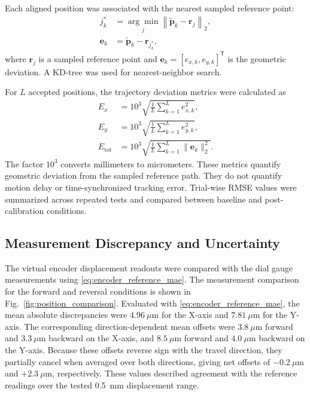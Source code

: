 \documentclass[journal]{IEEEtran}
\newcommand{\figref}[1]{Fig.~\ref{#1}}
\begin{document}
Each aligned position was associated with
the nearest sampled reference point:
\begin{equation}
\label{eq:trajectory_nearest_reference}
\begin{aligned}
j_k^{*}
&=
\underset{j}{\arg\min}
\left\|
\tilde{\mathbf p}_k-\mathbf r_j
\right\|_2,\\
\mathbf e_k
&=
\tilde{\mathbf p}_k-\mathbf r_{j_k^{*}},
\end{aligned}
\end{equation}
where $\mathbf r_j$ is a sampled reference point
and $\mathbf e_k=[e_{x,k},e_{y,k}]^{\mathsf T}$
is the geometric deviation.
A KD-tree was used for nearest-neighbor search.

For $L$ accepted positions, the trajectory
deviation metrics were calculated as
\begin{equation}
\label{eq:trajectory_deviation_rmse}
\begin{aligned}
E_x
&=
10^3
\sqrt{\frac{1}{L}
\sum_{k=1}^{L}e_{x,k}^{2}},\\
E_y
&=
10^3
\sqrt{\frac{1}{L}
\sum_{k=1}^{L}e_{y,k}^{2}},\\
E_{\mathrm{tot}}
&=
10^3
\sqrt{\frac{1}{L}
\sum_{k=1}^{L}\|\mathbf e_k\|_2^{2}}.
\end{aligned}
\end{equation}
The factor $10^3$ converts millimeters
to micrometers.
These metrics quantify geometric deviation
from the sampled reference path.
They do not quantify motion delay or
time-synchronized tracking error.
Trial-wise RMSE values were summarized across
repeated tests and compared between baseline
and post-calibration conditions.

\subsection{Measurement Discrepancy and Uncertainty}

The virtual encoder displacement readouts were compared
with the dial gauge measurements using
\eqref{eq:encoder_reference_mae}.
The measurement comparison for the forward and
reversal conditions is shown in
\figref{fig:position_comparison}.
Evaluated with \eqref{eq:encoder_reference_mae}, the mean
absolute discrepancies were $4.96~\mu\text{m}$ for the
X-axis and $7.81~\mu\text{m}$ for the Y-axis.
The corresponding direction-dependent mean offsets were
$3.8~\mu\text{m}$ forward and $3.3~\mu\text{m}$ backward
on the X-axis, and $8.5~\mu\text{m}$ forward and
$4.0~\mu\text{m}$ backward on the Y-axis. Because these
offsets reverse sign with the travel direction, they
partially cancel when averaged over both directions,
giving net offsets of $-0.2~\mu\text{m}$ and
$+2.3~\mu\text{m}$, respectively.
These values described agreement with the reference
readings over the tested 0.5~mm displacement range.
\end{document}
